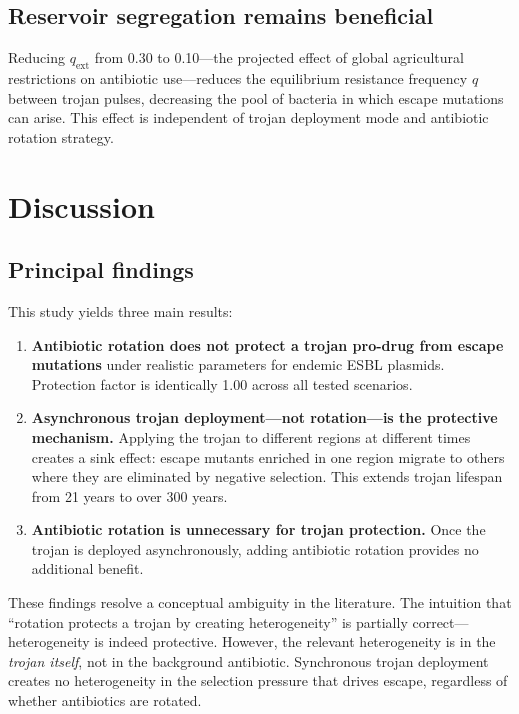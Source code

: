 \documentclass[12pt,a4paper]{article}
\begin{document}
\subsection{Reservoir segregation remains beneficial}

Reducing $q_{\text{ext}}$ from 0.30 to 0.10---the projected effect of global agricultural restrictions on antibiotic use---reduces the equilibrium resistance frequency $q$ between trojan pulses, decreasing the pool of bacteria in which escape mutations can arise. This effect is independent of trojan deployment mode and antibiotic rotation strategy.

\section{Discussion}

\subsection{Principal findings}

This study yields three main results:

\begin{enumerate}
    \item \textbf{Antibiotic rotation does not protect a trojan pro-drug from escape mutations} under realistic parameters for endemic ESBL plasmids. Protection factor is identically 1.00 across all tested scenarios.
    \item \textbf{Asynchronous trojan deployment---not rotation---is the protective mechanism.} Applying the trojan to different regions at different times creates a sink effect: escape mutants enriched in one region migrate to others where they are eliminated by negative selection. This extends trojan lifespan from 21 years to over 300 years.
    \item \textbf{Antibiotic rotation is unnecessary for trojan protection.} Once the trojan is deployed asynchronously, adding antibiotic rotation provides no additional benefit.
\end{enumerate}

These findings resolve a conceptual ambiguity in the literature. The intuition that ``rotation protects a trojan by creating heterogeneity'' is partially correct---heterogeneity is indeed protective. However, the relevant heterogeneity is in the \textit{trojan itself}, not in the background antibiotic. Synchronous trojan deployment creates no heterogeneity in the selection pressure that drives escape, regardless of whether antibiotics are rotated.
\end{document}
